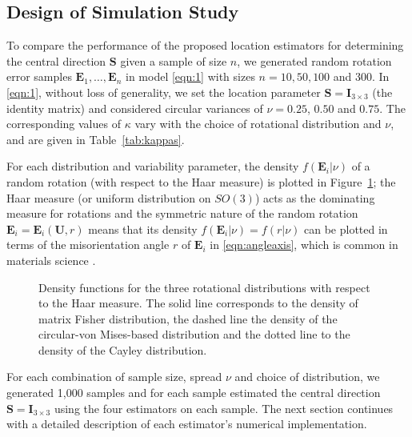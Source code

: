 \subsection{Design of Simulation Study}
\label{subsec:simdesign}
To compare the performance of the proposed location estimators for determining the central direction $\bm{S}$ given a sample of size $n$, we generated random rotation error samples  $\bm E_1, \ldots, \bm E_n$  in model \eqref{eqn:1} with sizes $n=10, 50, 100$ and 300. In \eqref{eqn:1}, without loss of generality, we set the location parameter $\bm S=\bm I_{3\times 3}$ (the identity matrix) and considered circular variances of $\nu=0.25$, $0.50$ and $0.75$.  The corresponding values of $\kappa$ vary with the choice of rotational distribution and $\nu$, and are given in Table~\ref{tab:kappas}.  

For each distribution and variability parameter, the density $f(\bm E_i|\nu)$ of a random rotation (with respect to the Haar measure) is plotted in Figure~\ref{fig:Haar}; the Haar measure (or uniform distribution on $SO(3)$) acts as the dominating measure for rotations and the symmetric nature of the random rotation $\bm E_i=\bm E_i(\bm U,r)$ means that its density $f(\bm E_i|\nu)=f(r|\nu)$ can be plotted in terms of the misorientation angle $r$ of $\bm E_i$ in \eqref{eqn:angleaxis}, which is common in materials science \citep{matthies88, savyolova95}. 


\begin{figure}[h!]
\centering
{}
\caption{Density functions for the three rotational distributions with respect to the Haar measure.  The solid line corresponds to the density of matrix Fisher distribution, the dashed line the density of the circular-von Mises-based distribution and the dotted line to the density of the Cayley distribution.}
\label{fig:Haar}
\end{figure}


For each combination of sample size, spread $\nu$ and choice of distribution, we generated 1,000 samples and for each sample estimated the central direction  $\bm S=\bm I_{3\times 3}$ using the four estimators on each sample.  The next section continues with a detailed description of each estimator's numerical implementation.  

